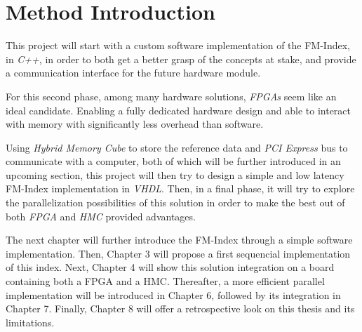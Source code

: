 \section{Method Introduction}

This project will start with a custom software implementation of the FM-Index, in \textsl{C++}, in order to both get a better grasp of the concepts at stake, and provide a communication interface for the future hardware module.

 For this second phase, among many hardware solutions, \textsl{FPGAs} seem like an ideal candidate. Enabling a fully dedicated hardware design and able to interact with memory with significantly less overhead than software.

Using \textsl{Hybrid Memory Cube} to store the reference data and \textsl{PCI Express} bus to communicate with a computer, both of which will be further introduced in an upcoming section, this project will then try to design a simple and low latency FM-Index implementation in \textsl{VHDL}. Then, in a final phase, it will try to explore the parallelization possibilities of this solution in order to make the best out of both \textsl{FPGA} and \textsl{HMC} provided advantages.

The next chapter will further introduce the FM-Index through a simple software implementation. Then, Chapter 3 will propose a first sequencial implementation of this index. Next, Chapter 4 will show this solution integration on a board containing both a FPGA and a HMC. Thereafter, a more efficient parallel implementation will be introduced in Chapter 6, followed by its integration in Chapter 7. Finally, Chapter 8 will offer a retrospective look on this thesis and its limitations.